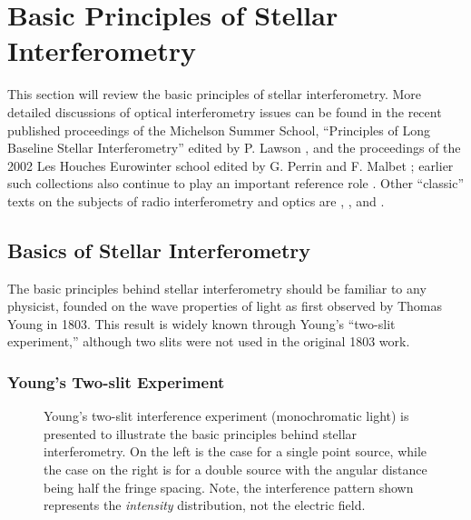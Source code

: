 \documentclass[12pt]{iopart}
\begin{document}

\section{Basic Principles of Stellar Interferometry}

This section will review the basic principles of stellar
interferometry.  More detailed discussions of optical interferometry
issues can be found in the recent published proceedings of the Michelson
Summer School, ``Principles of Long Baseline Stellar Interferometry''
edited by P. Lawson \citep{mss2000}, and the proceedings of the 2002 Les
Houches Eurowinter school edited by G. Perrin and F. Malbet
\citep{leshouches2002}; earlier such collections also continue to play an
important reference role \citep[e.g.,][]{nrao86, nato1997}.
Other ``classic'' texts on the
subjects of radio interferometry and optics are \citet{tms2001},
\citet{bw65}, and \citet{goodman1985}.

\subsection{Basics of Stellar Interferometry}
The basic principles behind stellar interferometry should be 
familiar to any physicist, founded on the wave properties of light
as first observed by Thomas Young in 1803.  This result is widely known
through Young's ``two-slit experiment,'' although two slits were not used in the
original 1803 work.

\subsubsection{Young's Two-slit Experiment}

\begin{figure}
\begin{center}
\centerline{}
\caption[Simple interferometer]{
  Young's two-slit interference experiment (monochromatic light) is
  presented to illustrate the basic principles behind stellar
  interferometry.  On the left is the case for a single point source,
  while the case on the right is for a double source with the angular
  distance being half the fringe spacing. Note, the interference
  pattern shown represents the {\em intensity} distribution, not the electric
  field.
\label{fig:2slit}}
\end{center}
\end{figure}
\end{document}
